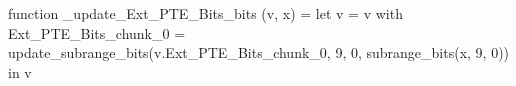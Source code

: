 function _update_Ext_PTE_Bits_bits (v, x) = let v = { v with Ext_PTE_Bits_chunk_0 = update_subrange_bits(v.Ext_PTE_Bits_chunk_0, 9, 0, subrange_bits(x, 9, 0)) } in
  v
